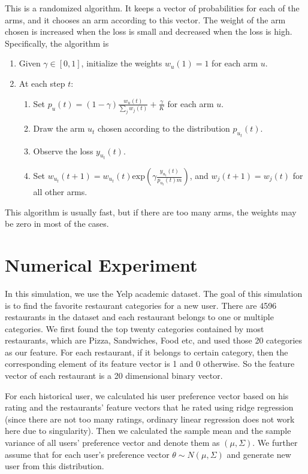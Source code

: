 \documentclass{article}
\theoremstyle{plain}
\theoremstyle{definition}
\begin{document}
This is a randomized algorithm. It keeps a vector of probabilities
for each of the arms, and it chooses an arm according to this vector.
The weight of the arm chosen is increased when the loss is small and
decreased when the loss is high. Specifically, the algorithm is
\begin{enumerate}
\item Given $\gamma\in\left[0,1\right]$, initialize the weights $w_{u}\left(1\right)=1$
for each arm $u$.
\item At each step $t$:

\begin{enumerate}
\item Set $p_{u}\left(t\right)=\left(1-\gamma\right)\frac{w_{u}\left(t\right)}{\sum_{j}w_{j}\left(t\right)}+\frac{\gamma}{K}$
for each arm $u$.
\item Draw the arm $u_{t}$ chosen according to the distribution $p_{u_{t}}\left(t\right)$.
\item Observe the loss $y_{u_{t}}\left(t\right)$.
\item Set $w_{u_{t}}\left(t+1\right)=w_{u_{t}}\left(t\right)\mbox{exp}\left(\gamma\frac{y_{u_{t}}\left(t\right)}{p_{u_{t}}\left(t\right)m}\right)$,
and $w_{j}\left(t+1\right)=w_{j}\left(t\right)$ for all other arms. 
\end{enumerate}
\end{enumerate}
This algorithm is usually fast, but if there are too many arms, the
weights may be zero in most of the cases. 



\section{Numerical Experiment}
In this simulation, we use the Yelp academic dataset. The goal of this simulation is to find the favorite restaurant categories for a new user. There are 4596 restaurants in the dataset and each restaurant belongs to one or multiple categories. We first found the top twenty categories contained by most restaurants, which are Pizza, Sandwiches, Food etc, and used those 20 categories as our feature. For each restaurant, if it belongs to certain category, then the corresponding element of its feature vector is 1 and 0 otherwise. So the feature vector of each restaurant is a 20 dimensional binary vector. 

For each historical user, we calculated his user preference vector based on his rating and the restaurants' feature vectors that he rated using ridge regression (since there are not too many ratings, ordinary linear regression does not work here due to singularity). Then we calculated the sample mean and the sample variance of all users' preference vector and denote them as $(\mu,\Sigma)$. We further assume that for each user's preference vector $\theta\sim N(\mu,\Sigma)$ and generate new user from this distribution.
\end{document}

